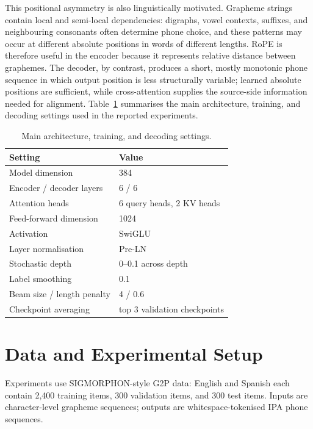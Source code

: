 \documentclass[11pt]{article}
\begin{document}
This positional asymmetry is also linguistically motivated. Grapheme strings
contain local and semi-local dependencies: digraphs, vowel contexts, suffixes,
and neighbouring consonants often determine phone choice, and these patterns may
occur at different absolute positions in words of different lengths. RoPE is
therefore useful in the encoder because it represents relative distance between
graphemes. The decoder, by contrast, produces a short, mostly monotonic phone
sequence in which output position is less structurally variable; learned
absolute positions are sufficient, while cross-attention supplies the
source-side information needed for alignment.
Table~\ref{tab:hyperparams} summarises the main architecture, training, and
decoding settings used in the reported experiments.

\begin{table}[!htbp]
\centering
\small
\begin{tabular}{ll}
\toprule
Setting & Value \\
\midrule
Model dimension & 384 \\
Encoder / decoder layers & 6 / 6 \\
Attention heads & 6 query heads, 2 KV heads \\
Feed-forward dimension & 1024 \\
Activation & SwiGLU \\
Layer normalisation & Pre-LN \\
Stochastic depth & 0--0.1 across depth \\
Label smoothing & 0.1 \\
Beam size / length penalty & 4 / 0.6 \\
Checkpoint averaging & top 3 validation checkpoints \\
\bottomrule
\end{tabular}
\caption{Main architecture, training, and decoding settings.}
\label{tab:hyperparams}
\end{table}

\section{Data and Experimental Setup}
\label{sec:setup}

Experiments use SIGMORPHON-style G2P data: English and Spanish each contain
2,400 training items, 300 validation items, and 300 test items. Inputs are
character-level grapheme sequences; outputs are whitespace-tokenised IPA phone
sequences.
\end{document}
